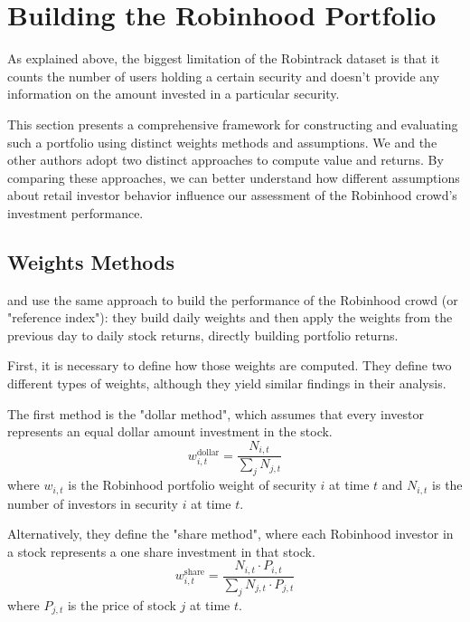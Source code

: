 \section{Building the Robinhood Portfolio}
As explained above, the biggest limitation of the Robintrack dataset is that it counts the number of users holding a certain security and doesn't provide any information on the amount invested in a particular security. 

This section presents a comprehensive framework for constructing and evaluating such a portfolio using distinct weights methods and assumptions. 
We and the other authors adopt two distinct approaches to compute value and returns.
By comparing these approaches, we can better understand how different assumptions about retail investor behavior influence our assessment of the Robinhood crowd's investment performance.


\subsection{Weights Methods} 
\cite{Fedyk2024} and \cite{Welch2022} use the same approach to build the performance of the Robinhood crowd (or "reference index"): 
they build daily weights and then apply the weights from the previous day to daily stock returns, directly building portfolio returns. 

First, it is necessary to define how those weights are computed. They define two different types of weights, although they yield similar findings in their analysis.

The first method is the "dollar method", which assumes that every investor represents an equal dollar amount investment in the stock. 
\begin{equation}
    w^{\text{dollar}}_{i,t} = \frac{N_{i,t}}{\sum_j N_{j,t}}
    \label{weight_dollar}
\end{equation}
where $w_{i,t}$ is the Robinhood portfolio weight of security $i$ at time $t$ and $N_{i,t}$ is the number of investors in security $i$ at time $t$.

Alternatively, they define the "share method", where each Robinhood investor in a stock represents a one share investment in that stock.
\begin{equation}
    w^{\text{share}}_{i,t} = \frac{N_{i,t}\cdot P_{i,t}}{\sum_j N_{j,t}\cdot P_{j,t}}
    \label{weight_share}
\end{equation}
where $P_{j,t}$ is the price of stock $j$ at time $t$.

